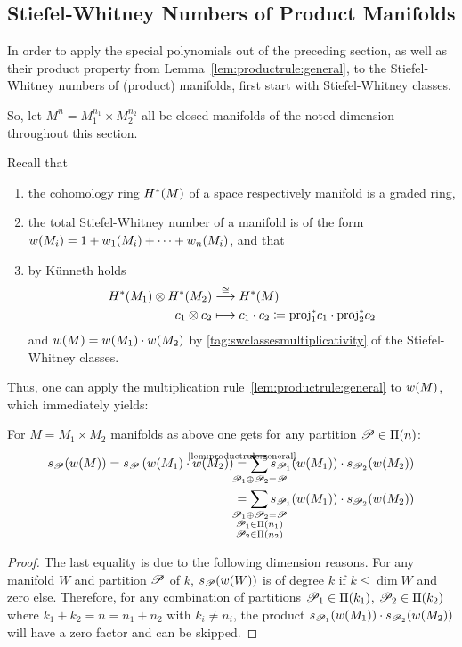 \subsection{Stiefel-Whitney Numbers of Product Manifolds}
\label{sec:swnumsofproductmfds}
In order to apply the special polynomials out of the preceding
section, as well as their product property from
Lemma~\ref{lem:productrule:general}, to the Stiefel-Whitney
numbers of (product) manifolds, first start with Stiefel-Whitney
classes.

So, let $M^n=M_1^{n_1}\times M_2^{n_2}$ all be closed manifolds of the
noted dimension throughout this section.

Recall that
\begin{enumerate}
\item the cohomology ring $H^*(M)$ of a space respectively
  manifold is a graded ring,
\item the total Stiefel-Whitney number of a manifold is of the form
  ${w}(M_i) = 1 + {w_{1}}(M_i) + \dotsb + {w_{n}}(M_i)$, and that
\item by Künneth holds
  \begin{align*}
    H^*(M_1)\otimes H^*(M_2)
    &\overset{\cong}{\longrightarrow} H^*(M)
    \\
    c_1 \otimes c_2
    &\longmapsto c_1\cdot c_2
      \coloneqq {\mathrm{proj}}^*_1 c_1 \cdot {\mathrm{proj}}^*_2 c_2
  \end{align*}
  and ${w}(M) = {w}(M_1) \cdot {w}(M_2)$ by
  \ref{tag:swclassesmultiplicativity} of the Stiefel-Whitney classes.
\end{enumerate}
Thus, one can apply the multiplication
rule~\ref{lem:productrule:general} to ${w}(M)$, which immediately
yields:
\begin{Cor}\label{cor:productrule:swcl}
  For $M=M_1\times M_2$ manifolds as above one gets for any partition
  $\mathscr{P}\in\Pi({n})$:
  \begin{align*}
    \s{\Part}(\W{M})
    =
    \s{\Part}\left(\W{M_1}\cdot \W{M_2}\right)
    &\cequalsby{\ref{lem:productrule:general}}
      \sum_{\mathclap{\Part_1\concat\Part_2=\Part}}
      \s{\Part_1}(\W{M_1}) \cdot \s{\Part_2}(\W{M_2})
    \\ &=
         \sum_{\mathclap{\substack{
         \Part_1\concat\Part_2=\Part\\
    \Part_1\in\PartitionsOf{n_1}\\
    \Part_2\in\PartitionsOf{n_2}\\
    }}}
    \s{\Part_1}(\W{M_1}) \cdot \s{\Part_2}(\W{M_2})
  \end{align*}
  \begin{proof}
    The last equality is due to the following dimension reasons.
    For any manifold $W$ and partition $\mathscr{P}$ of $k$,
    $s_{\mathscr{P}}({w}(W))$ is of degree $k$ if $k\leq\dim W$ and zero else.
    Therefore, for any combination of partitions
    $\mathscr{P}_1\in\Pi({k_1})$,
    $\mathscr{P}_2\in\Pi({k_2})$
    where $k_1+k_2=n=n_1+n_2$ with $k_i\neq n_i$, the product
    $s_{\mathscr{P}_1}({w}(M_1))\cdot s_{\mathscr{P}_2}({w}(M_2))$ will have a zero
    factor and can be skipped.
  \end{proof}
\end{Cor}

